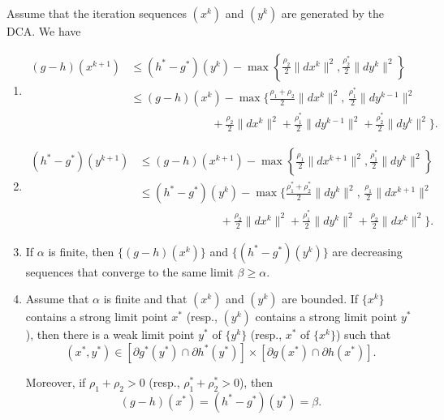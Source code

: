 \begin{theorem}\label{thm:convergence_dc}
Assume that the iteration sequences $(x^k)$ and $(y^k)$ are generated by the DCA. We have
\begin{enumerate}
\item[(i)]
\begin{align*}
(g - h)(x^{k+1})
&\le (h^* - g^*)(y^k)
- \max \left\{ \frac{\rho_2}{2} \|d x^k\|^2, \frac{\rho_2^*}{2} \|d y^k\|^2 \right\} \\
&\le (g - h)(x^k)
- \max \Bigg\{
\frac{\rho_1 + \rho_2}{2} \|d x^k\|^2,\,
\frac{\rho_1^*}{2} \|d y^{k-1}\|^2 \\
&\hspace{3cm}
+ \frac{\rho_2}{2} \|d x^k\|^2
+ \frac{\rho_1^*}{2} \|d y^{k-1}\|^2
+ \frac{\rho_2^*}{2} \|d y^k\|^2
\Bigg\}.
\end{align*}

\item[(ii)]
\begin{align*}
(h^* - g^*)(y^{k+1})
&\le (g - h)(x^{k+1})
- \max \left\{ \frac{\rho_1}{2} \|d x^{k+1}\|^2, \frac{\rho_1^*}{2} \|d y^k\|^2 \right\} \\
&\le (h^* - g^*)(y^k)
- \max \Bigg\{
\frac{\rho_1^* + \rho_2^*}{2} \|d y^k\|^2,\,
\frac{\rho_1}{2} \|d x^{k+1}\|^2 \\
&\hspace{3cm}
+ \frac{\rho_2}{2} \|d x^k\|^2
+ \frac{\rho_1^*}{2} \|d y^k\|^2
+ \frac{\rho_2}{2} \|d x^k\|^2
\Bigg\}.
\end{align*}

\item[(iii)]
If $\alpha$ is finite, then $\{(g-h)(x^k)\}$ and $\{(h^*-g^*)(y^k)\}$ are decreasing sequences that converge to the same limit $\beta \ge \alpha$.

\item[(iv)]
Assume that $\alpha$ is finite and that $(x^k)$ and $(y^k)$ are bounded.  
If $\{x^k\}$ contains a strong limit point $x^*$ (resp., $(y^k)$ contains a strong limit point $y^*$), then there is a weak limit point $y^*$ of $\{y^k\}$ (resp., $x^*$ of $\{x^k\}$) such that
\[
(x^*, y^*) \in [\partial g^*(y^*) \cap \partial h^*(y^*)]
\times
[\partial g(x^*) \cap \partial h(x^*)].
\]

Moreover, if $\rho_1 + \rho_2 > 0$ (resp., $\rho_1^* + \rho_2^* > 0$), then
\[
(g - h)(x^*) = (h^* - g^*)(y^*) = \beta.
\]
\end{enumerate}
\end{theorem}





